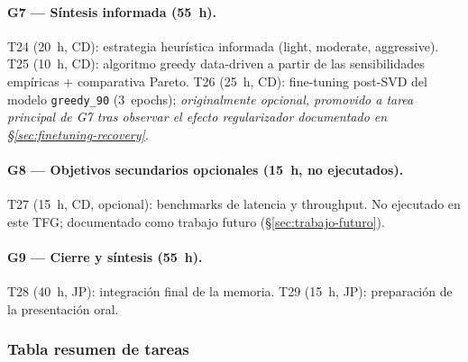 \paragraph{G7 --- Síntesis informada (55~h).}
T24 (20~h, CD): estrategia heurística informada (light, moderate,
aggressive). T25 (10~h, CD): algoritmo greedy data-driven a partir de
las sensibilidades empíricas + comparativa Pareto. T26 (25~h, CD):
fine-tuning post-SVD del modelo \texttt{greedy\_90} (3~epochs);
\emph{originalmente opcional, promovido a tarea principal de G7 tras
observar el efecto regularizador documentado en
\S\ref{sec:finetuning-recovery}}.

\paragraph{G8 --- Objetivos secundarios opcionales (15~h, no
ejecutados).}
T27 (15~h, CD, opcional): benchmarks de latencia y throughput. No
ejecutado en este TFG; documentado como trabajo futuro
(\S\ref{sec:trabajo-futuro}).

\paragraph{G9 --- Cierre y síntesis (55~h).}
T28 (40~h, JP): integración final de la memoria. T29 (15~h, JP):
preparación de la presentación oral.

\subsubsection{Tabla resumen de tareas}

